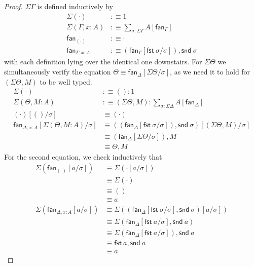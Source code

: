 \documentclass[10pt]{article}
\theoremstyle{definition}
\newcommand\dsd[1]{\ensuremath{\mathsf{#1}}}
\newcommand{\app}[2]{\ensuremath{#1 \: #2}}
\newcommand{\mt}[0]{\ensuremath{()}}
\newcommand{\fst}[1]{\app{\dsd{fst}}{#1}}
\newcommand{\snd}[1]{\app{\dsd{snd}}{#1}}
\newcommand\fan[1]{\ensuremath{\mathsf{fan}_{#1}}}
\begin{document}
\begin{proof}
$\Sigma \Gamma$ is defined inductively by
\begin{align*}
\Sigma (\cdot) &:\equiv 1 \\
\Sigma (\Gamma, x : A) &:\equiv \sum_{\sigma : \Sigma \Gamma} A[\fan{\Gamma}] \\
\fan{(\cdot)} &:\equiv \cdot \\
\fan{\Gamma, x : A} &:\equiv (\fan\Gamma[\fst{\sigma}/\sigma]), \snd{\sigma}
\end{align*}
with each definition lying over the identical one downstairs. For $\Sigma \Theta$ we simultaneously verify the equation $\Theta \equiv \fan{\Delta}[\Sigma \Theta / \sigma]$, as we need it to hold for $(\Sigma \Theta, M)$ to be well typed.
\begin{align*}
\Sigma(\cdot) &:\equiv \mt : 1\\
\Sigma(\Theta, M : A) &:\equiv (\Sigma \Theta, M) : \sum_{\sigma : \Sigma \Delta} A[\fan{\Delta}] \\
(\cdot)[()/\sigma]  &\equiv (\cdot) \\
\fan{\Delta, x : A}[\Sigma(\Theta, M : A)/\sigma] &\equiv ((\fan{\Delta}[\fst{\sigma}/\sigma]), \snd{\sigma})[(\Sigma \Theta, M)/\sigma] \\
&\equiv (\fan{\Delta}[\Sigma \Theta/\sigma]), M \\
&\equiv \Theta, M
\end{align*}
For the second equation, we check inductively that
\begin{align*}
\Sigma(\fan{(\cdot)}[a/\sigma]) 
&\equiv \Sigma(\cdot[a/\sigma]) \\
&\equiv \Sigma(\cdot) \\
&\equiv () \\
&\equiv a \\
\Sigma(\fan{\Delta, x : A}[a/\sigma]) 
&\equiv \Sigma((\fan{\Delta}[\fst \sigma/\sigma], \snd \sigma)[a/\sigma]) \\
&\equiv \Sigma(\fan{\Delta}[\fst a/\sigma], \snd a) \\
&\equiv \Sigma(\fan{\Delta}[\fst a/\sigma]), \snd a \\
&\equiv \fst a, \snd a \\
&\equiv a
\end{align*}
\end{proof}
\end{document}
